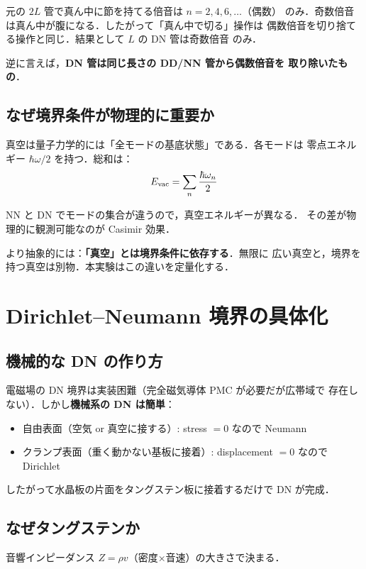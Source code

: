 \documentclass[11pt,a4paper]{article}
\begin{document}
元の $2L$ 管で真ん中に節を持てる倍音は $n=2, 4, 6,\ldots$（偶数）
のみ．奇数倍音は真ん中が腹になる．したがって「真ん中で切る」操作は
偶数倍音を切り捨てる操作と同じ．結果として $L$ の DN 管は奇数倍音
のみ．

逆に言えば，\textbf{DN 管は同じ長さの DD/NN 管から偶数倍音を
取り除いたもの}．

\subsection{なぜ境界条件が物理的に重要か}

真空は量子力学的には「全モードの基底状態」である．各モードは
零点エネルギー $\hbar\omega/2$ を持つ．総和は：
\begin{equation}
E_{\rm vac} = \sum_n \frac{\hbar\omega_n}{2}
\end{equation}

NN と DN でモードの集合が違うので，真空エネルギーが異なる．
その差が物理的に観測可能なのが Casimir 効果．

より抽象的には：\textbf{「真空」とは境界条件に依存する}．無限に
広い真空と，境界を持つ真空は別物．本実験はこの違いを定量化する．

\section{Dirichlet--Neumann 境界の具体化}

\subsection{機械的な DN の作り方}

電磁場の DN 境界は実装困難（完全磁気導体 PMC が必要だが広帯域で
存在しない）．しかし\textbf{機械系の DN は簡単}：

\begin{itemize}
\item 自由表面（空気 or 真空に接する）: stress $= 0$ なので Neumann
\item クランプ表面（重く動かない基板に接着）: displacement $= 0$ なので Dirichlet
\end{itemize}

したがって水晶板の片面をタングステン板に接着するだけで DN が完成．

\subsection{なぜタングステンか}

音響インピーダンス $Z = \rho v$（密度×音速）の大きさで決まる．
\end{document}
